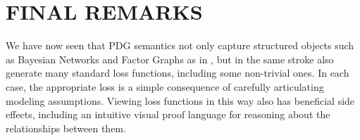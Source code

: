 \documentclass[twoside]{article}
\makeatletter
\newif\ifmarginprooflinks\marginprooflinksfalse
\theoremstyle{plain}
\theoremstyle{definition}
\DeclareMathOperator*{\Ex}{\mathbb{E}} %
\newcommand{\datadist}[1]{\Pr\nolimits_{#1}}
\newcommand{\V}{\mathcal V}
\newcommand\aar{\@ifstar\aar@one@star\aar@plain}
\newcommand\aar@one@star{\@ifstar\aar@resize{\aar@plain*}}
\newcommand\aar@resize[1]{\sbox{\aar@content}{#1}\scaleleftright[3.8ex]
		{\Biggl\langle\!\!\!\!\Biggl\langle}{\usebox{\aar@content}}
		{\Biggr\rangle\!\!\!\!\Biggr\rangle}}
\newenvironment{linked}[3][]{%
		\def\linkedproof{#3}%
		\def\linkedtype{#2}%
		\ifmarginprooflinks
		\marginpar{%
			\vspace{1.5em}
			\centering%
			\hyperref[proof:\linkedproof]{%
			\color{blue!30!white}%
			\scaleleftright{$\Big[$}{\,\mbox{\footnotesize\centering\tt\begin{tabular}{@{}c@{}}
				link to\\[-0.15em]
				proof
			\end{tabular}}\,}{$\Big]$}}~
			}%
		\fi
        \restatable[#1]{#2}{#2:#3}\label{#2:#3}%
        }%
		{\endrestatable%
		}
\makeatother
\begin{document}
%
%
%
%
%
%
%
%


\section{FINAL REMARKS}


We have now seen that PDG semantics not only capture structured objects such as Bayesian Networks and Factor Graphs as in \textcite{richardson2020probabilistic},
but in the same stroke also generate
%
many standard loss functions, including some non-trivial ones.
In each case, the appropriate loss is a simple consequence of carefully articulating modeling assumptions.
Viewing loss functions in this way also has beneficial side effects, including an intuitive visual proof language for reasoning about the relationships between them.
\end{document}
